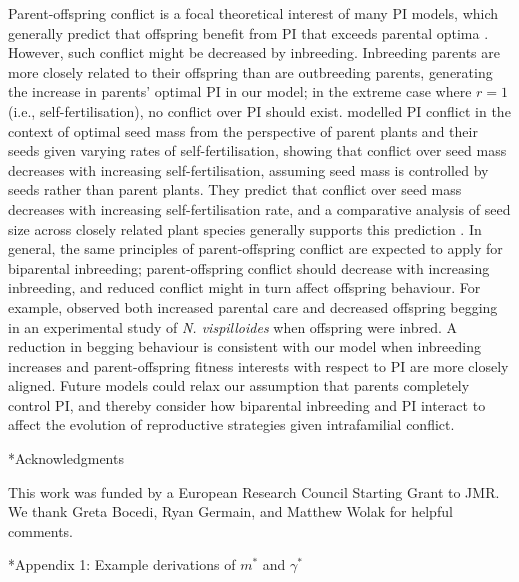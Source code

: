 \documentclass[12pt]{article}
\makeatletter
\renewcommand\section{\@startsection{section}{1}{0in}{-0.5\baselineskip}{0.1\baselineskip}{\normalfont\large\bfseries}}
\renewcommand\subsection{\@startsection{subsection}{1}{-0.25in}{-0.5\baselineskip}{0.1\baselineskip}{\normalfont\normalsize\bfseries\textit}}
\makeatother
\begin{document}
Parent-offspring conflict is a focal theoretical interest of many PI models, which generally predict that offspring benefit from PI that exceeds parental optima \cite[e.g.,][]{Macnair1978, Parker1978, Parker1985, DeJong2005}. However, such conflict might be decreased by inbreeding. Inbreeding parents are more closely related to their offspring than are outbreeding parents, generating the increase in parents' optimal PI in our model; in the extreme case where $r=1$ (i.e., self-fertilisation), no conflict over PI should exist. \cite{DeJong2005} modelled PI conflict in the context of optimal seed mass from the perspective of parent plants and their seeds given varying rates of self-fertilisation, showing that conflict over seed mass decreases with increasing self-fertilisation, assuming seed mass is controlled by seeds rather than parent plants. They predict that conflict over seed mass decreases with increasing self-fertilisation rate, and a comparative analysis of seed size across closely related plant species generally supports this prediction \cite[][]{DeJong2005}. In general, the same principles of parent-offspring conflict are expected to apply for biparental inbreeding; parent-offspring conflict should decrease with increasing inbreeding, and reduced conflict might in turn affect offspring behaviour. For example, \cite{Mattey2014} observed both increased parental care and decreased offspring begging in an experimental study of \textit{N. vispilloides} when offspring were inbred. A reduction in begging behaviour is consistent with our model when inbreeding increases and parent-offspring fitness interests with respect to PI are more closely aligned. Future models could relax our assumption that parents completely control PI, and thereby consider how biparental inbreeding and PI interact to affect the evolution of reproductive strategies given intrafamilial conflict.

\subsection*{Acknowledgments}

This work was funded by a European Research Council Starting Grant to JMR. We thank Greta Bocedi, Ryan Germain, and Matthew Wolak for helpful comments.

\section*{Appendix 1: Example derivations of $m^{*}$ and $\gamma^{*}$}
\end{document}
